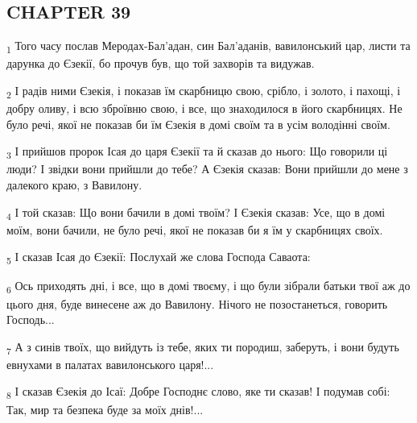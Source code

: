 \subsection{CHAPTER 39}
\begin{tcolorbox}
\textsubscript{1} Того часу послав Меродах-Бал'адан, син Бал'аданів, вавилонський цар, листи та дарунка до Єзекії, бо прочув був, що той захворів та видужав.
\end{tcolorbox}
\begin{tcolorbox}
\textsubscript{2} І радів ними Єзекія, і показав їм скарбницю свою, срібло, і золото, і пахощі, і добру оливу, і всю зброївню свою, і все, що знаходилося в його скарбницях. Не було речі, якої не показав би їм Єзекія в домі своїм та в усім володінні своїм.
\end{tcolorbox}
\begin{tcolorbox}
\textsubscript{3} І прийшов пророк Ісая до царя Єзекії та й сказав до нього: Що говорили ці люди? І звідки вони прийшли до тебе? А Єзекія сказав: Вони прийшли до мене з далекого краю, з Вавилону.
\end{tcolorbox}
\begin{tcolorbox}
\textsubscript{4} І той сказав: Що вони бачили в домі твоїм? І Єзекія сказав: Усе, що в домі моїм, вони бачили, не було речі, якої не показав би я їм у скарбницях своїх.
\end{tcolorbox}
\begin{tcolorbox}
\textsubscript{5} І сказав Ісая до Єзекії: Послухай же слова Господа Саваота:
\end{tcolorbox}
\begin{tcolorbox}
\textsubscript{6} Ось приходять дні, і все, що в домі твоєму, і що були зібрали батьки твої аж до цього дня, буде винесене аж до Вавилону. Нічого не позостанеться, говорить Господь...
\end{tcolorbox}
\begin{tcolorbox}
\textsubscript{7} А з синів твоїх, що вийдуть із тебе, яких ти породиш, заберуть, і вони будуть евнухами в палатах вавилонського царя!...
\end{tcolorbox}
\begin{tcolorbox}
\textsubscript{8} І сказав Єзекія до Ісаї: Добре Господнє слово, яке ти сказав! І подумав собі: Так, мир та безпека буде за моїх днів!...
\end{tcolorbox}
